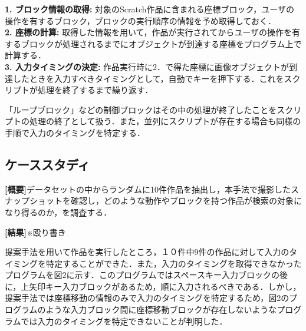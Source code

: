 \documentclass[uplatex,dvipdfmx,a4paper,twocolumn,base=11pt,jbase=11pt,ja=standard]{bxjsarticle}  %
\begin{document}
\noindent\textbf{1. ブロック情報の取得: }対象のScratch作品に含まれる座標ブロック，ユーザの操作を有するブロック，ブロックの実行順序の情報を予め取得しておく．\\
\noindent\textbf{2. 座標の計算: }取得した情報を用いて，作品が実行されてからユーザの操作を有するブロックが処理されるまでにオブジェクトが到達する座標をプログラム上で計算する．\\
\noindent\textbf{3. 入力タイミングの決定: }作品実行時に2．で得た座標に画像オブジェクトが到達したときを入力すべきタイミングとして，自動でキーを押下する．これをスクリプトが処理を終了するまで繰り返す．

「ループブロック」などの制御ブロックはその中の処理が終了したことをスクリプトの処理の終了として扱う．また，並列にスクリプトが存在する場合も同様の手順で入力のタイミングを特定する．

\subsection{ケーススタディ}

\noindent\textbf{[概要]}データセットの中からランダムに10件作品を抽出し，本手法で撮影したスナップショットを確認し，どのような動作やブロックを持つ作品が検索の対象になり得るのか，を調査する．

\noindent\textbf{[結果]}※殴り書き

提案手法を用いて作品を実行したところ，１０件中9件の作品に対して入力のタイミングを特定することができた．また，入力のタイミングを取得できなかったプログラムを図2に示す．このプログラムではスペースキー入力ブロックの後に，上矢印キー入力ブロックがあるため，順に入力されるべきである．しかし，提案手法では座標移動の情報のみで入力のタイミングを特定するため，図2のプログラムのような入力ブロック間に座標移動ブロックが存在しないようなプログラムでは入力のタイミングを特定できないことが判明した．
\end{document}
